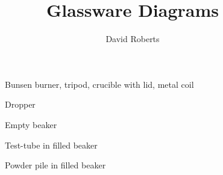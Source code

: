 \documentclass[a4paper,10pt]{article}
\title{Glassware Diagrams}
\author{David Roberts}
\date{}
\begin{document}
 \maketitle
 
 \begin{figure}[h!]
  \begin{center}
   \caption{Bunsen burner, tripod, crucible with lid, metal coil}
  \end{center}
 \end{figure}
 
 \begin{figure}[h!]
  \begin{center}
   \caption{Dropper}
  \end{center}
 \end{figure}
 
 \begin{figure}[h!]
  \begin{center}
   \caption{Empty beaker}
  \end{center}
 \end{figure}
 
 \begin{figure}[h!]
  \begin{center}
   \caption{Test-tube in filled beaker}
  \end{center}
 \end{figure}
 
 \begin{figure}[h!]
  \begin{center}
   \caption{Powder pile in filled beaker}
  \end{center}
 \end{figure}
 
\end{document}
